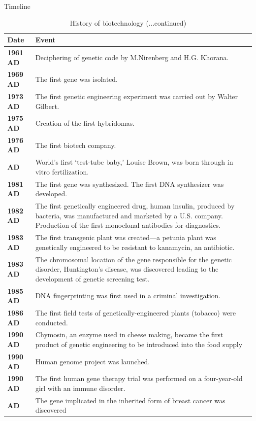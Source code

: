 \documentclass[ignorenonframetext,aspectratio=169]{beamer}
\begin{document}
\begin{frame}{Timeline}
\protect\hypertarget{timeline-1}{}

\begin{table}[t]

\caption{\label{tab:biotechnology-history2}History of biotechnology (...continued)}
\centering
\fontsize{5}{7}\selectfont
\begin{tabular}{>{\bfseries}l>{\raggedright\arraybackslash}p{40em}}
\toprule
Date & Event\\
\midrule
\rowcolor{gray!6}  1961 AD & Deciphering of genetic code by M.Nirenberg and H.G. Khorana.\\
1969 AD & The first gene was isolated.\\
\rowcolor{gray!6}  1973 AD & The first genetic engineering experiment was carried out by Walter Gilbert.\\
1975 AD & Creation of the first hybridomas.\\
\rowcolor{gray!6}  1976 AD & The first biotech company.\\
\addlinespace
1978 AD & World’s first ‘test-tube baby,’ Louise Brown, was born through in vitro fertilization.\\
\rowcolor{gray!6}  1981 AD & The first gene was synthesized. The first DNA synthesizer was developed.\\
1982 AD & The first genetically engineered drug, human insulin, produced by bacteria, was manufactured and marketed by a U.S. company. Production of the first monoclonal antibodies for diagnostics.\\
\rowcolor{gray!6}  1983 AD & The first transgenic plant was created—a petunia plant was genetically engineered to be resistant to kanamycin, an antibiotic.\\
1983 AD & The chromosomal location of the gene responsible for the genetic disorder, Huntington’s disease, was discovered leading to the development of genetic screening test.\\
\addlinespace
\rowcolor{gray!6}  1985 AD & DNA fingerprinting was first used in a criminal investigation.\\
1986 AD & The first field tests of genetically-engineered plants (tobacco) were conducted.\\
\rowcolor{gray!6}  1990 AD & Chymosin, an enzyme used in cheese making, became the first product of genetic engineering to be introduced into the food supply\\
1990 AD & Human genome project was launched.\\
\rowcolor{gray!6}  1990 AD & The first human gene therapy trial was performed on a four-year-old girl with an immune disorder.\\
\addlinespace
1991 AD & The gene implicated in the inherited form of breast cancer was discovered\\
\bottomrule
\end{tabular}
\end{table}

\end{frame}
\end{document}
